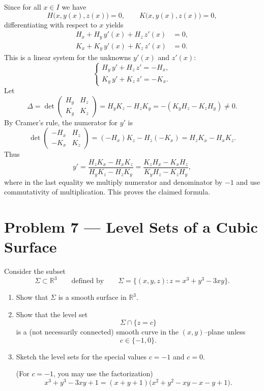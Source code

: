 \documentclass[12pt,a4paper]{article}
\theoremstyle{plain}
\theoremstyle{definition}      %
\begin{document}
	Since for all $x\in I$ we have
	\[
	H\bigl(x,y(x),z(x)\bigr) = 0,
	\qquad
	K\bigl(x,y(x),z(x)\bigr) = 0,
	\]
	differentiating with respect to $x$ yields
	\begin{align*}
		H_x + H_y\,y'(x) + H_z\,z'(x) &= 0, \\
		K_x + K_y\,y'(x) + K_z\,z'(x) &= 0.
	\end{align*}
	This is a linear system for the unknowns $y'(x)$ and $z'(x)$:
	\[
	\begin{cases}
		H_y\,y' + H_z\,z' = -H_x,\\
		K_y\,y' + K_z\,z' = -K_x.
	\end{cases}
	\]
	Let
	\[
	\Delta = \det
	\begin{pmatrix}
		H_y & H_z \\
		K_y & K_z
	\end{pmatrix}
	= H_y K_z - H_z K_y
	= -(K_y H_z - K_z H_y) \neq 0.
	\]
	By Cramer's rule, the numerator for $y'$ is
	\[
	\det
	\begin{pmatrix}
		-H_x & H_z \\
		-K_x & K_z
	\end{pmatrix}
	= (-H_x)K_z - H_z(-K_x)
	= H_z K_x - H_x K_z.
	\]
	Thus
	\[
	y'
	= \frac{H_z K_x - H_x K_z}{H_y K_z - H_z K_y}
	= \frac{K_z H_x - K_x H_z}{K_y H_z - K_z H_y},
	\]
	where in the last equality we multiply numerator and denominator by $-1$
	and use commutativity of multiplication.
	This proves the claimed formula.
	
	
	\section*{Problem 7 — Level Sets of a Cubic Surface}
	
	Consider the subset
	\[
	\Sigma \subset \mathbb{R}^3
	\qquad\text{defined by}\qquad
	\Sigma = \{(x,y,z) : z = x^3 + y^3 - 3xy\}.
	\]
	
	\begin{enumerate}[label=\textnormal{(\alph*)}]
		
		\item
		Show that $\Sigma$ is a smooth surface in $\mathbb{R}^3$.
		
		\item
		Show that the level set
		\[
		\Sigma \cap \{z=c\}
		\]
		is a (not necessarily connected) smooth curve in the $(x,y)$–plane
		unless
		\[
		c \in \{-1,0\}.
		\]
		
		\item
		Sketch the level sets for the special values $c=-1$ and $c=0$.
		
		(For $c=-1$, you may use the factorization)
		\[
		x^3 + y^3 - 3xy + 1
		= (x+y+1)\bigl(x^2 + y^2 - xy - x - y + 1\bigr).
		\]
		
	\end{enumerate}
	
\end{document}
